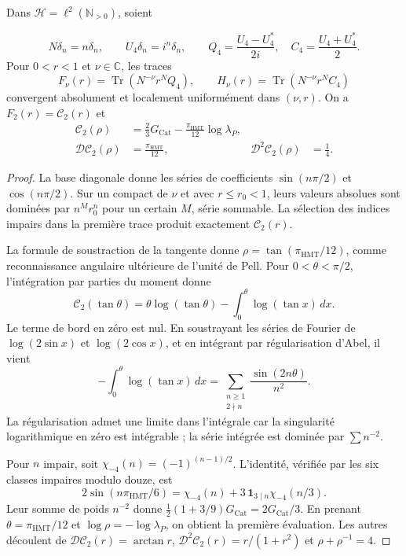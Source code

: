 \begin{proposition}
\label{corpus9:iv:pell-evaluacion}
Dans \(\mathcal H=\ell^2(\mathbb N_{>0})\), soient

\[
 N\delta_n=n\delta_n,\qquad U_4\delta_n=i^n\delta_n,\qquad
 Q_4=\frac{U_4-U_4^*}{2i},\quad
 C_4=\frac{U_4+U_4^*}{2}.
\]
Pour \(0<r<1\) et \(\nu\in\mathbb C\), les traces
\[
 F_\nu(r)=\operatorname{Tr}(N^{-\nu}r^NQ_4),\qquad
 H_\nu(r)=\operatorname{Tr}(N^{-\nu}r^NC_4)
\]
convergent absolument et localement uniformément dans
\((\nu,r)\). On a \(F_2(r)=\mathcal C_2(r)\) et
\begin{align}
 \mathcal C_2(\rho)
   &=\frac23G_{\mathrm{Cat}}
     -\frac{\pi_{\mathrm{HMT}}}{12}\log\lambda_P,\\
 \mathcal D\mathcal C_2(\rho)&=\frac{\pi_{\mathrm{HMT}}}{12},
 &\mathcal D^2\mathcal C_2(\rho)&=\frac14 .
 \label{corpus9:iv:pell-valores}
\end{align}
\end{proposition}
\begin{proof}
La base diagonale donne les séries de coefficients
\(\sin(n\pi/2)\) et \(\cos(n\pi/2)\). Sur un compact de
\(\nu\) et avec \(r\leq r_0<1\), leurs valeurs absolues sont
dominées par \(n^M r_0^n\) pour un certain \(M\), série sommable.
La sélection des indices impairs dans la première trace
produit exactement \(\mathcal C_2(r)\).


La formule de soustraction de la tangente donne
\(\rho=\tan(\pi_{\mathrm{HMT}}/12)\), comme reconnaissance
angulaire ultérieure de l’unité de Pell. Pour
\(0<\theta<\pi/2\), l’intégration par parties du moment donne
\[
 \mathcal C_2(\tan\theta)
  =\theta\log(\tan\theta)-\int_0^\theta\log(\tan x)\,dx.
\]
Le terme de bord en zéro est nul. En soustrayant les séries
de Fourier de \(\log(2\sin x)\) et \(\log(2\cos x)\), et en
intégrant par régularisation d’Abel, il vient
\[
 -\int_0^\theta\log(\tan x)\,dx
   =\sum_{\substack{n\geq1\\2\nmid n}}
          \frac{\sin(2n\theta)}{n^2}.
\]
La régularisation admet une limite dans l’intégrale car la
singularité logarithmique en zéro est intégrable ; la série
intégrée est dominée par \(\sum n^{-2}\).

Pour \(n\) impair, soit \(\chi_{-4}(n)=(-1)^{(n-1)/2}\).
L’identité, vérifiée par les six classes impaires modulo
douze, est
\[
 2\sin(n\pi_{\mathrm{HMT}}/6)
   =\chi_{-4}(n)
     +3\,\mathbf1_{3\mid n}\chi_{-4}(n/3).
\]
Leur somme de poids \(n^{-2}\) donne
\(\frac12(1+3/9)G_{\mathrm{Cat}}=2G_{\mathrm{Cat}}/3\).
En prenant \(\theta=\pi_{\mathrm{HMT}}/12\) et
\(\log\rho=-\log\lambda_P\), on obtient la première
évaluation. Les autres découlent de
\(\mathcal D\mathcal C_2(r)=\arctan r\),
\(\mathcal D^2\mathcal C_2(r)=r/(1+r^2)\) et
\(\rho+\rho^{-1}=4\).

\end{proof}


